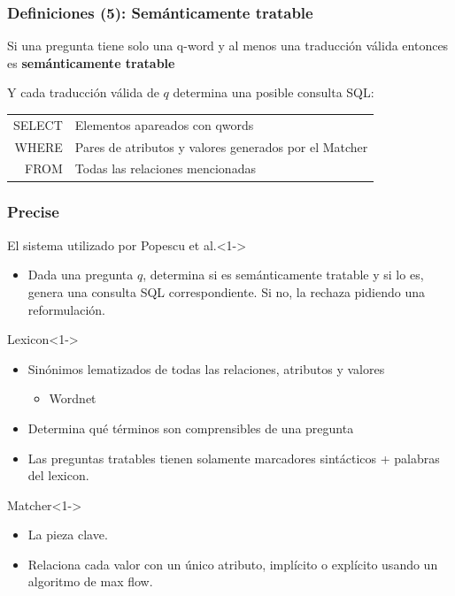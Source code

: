 \fontsize{10pt}{11.2}\selectfont
\begin{frame}[<+->]
\frametitle{Definiciones (5): Semánticamente tratable}
Si una pregunta tiene solo una q-word y al menos una traducción válida entonces es \textbf{semánticamente tratable}

\bigskip
\bigskip

Y cada traducción válida de $q$ determina una posible consulta SQL:
\bigskip
\centering
\begin{tabular}{ r | l }
SELECT &  Elementos apareados con qwords \\
WHERE & Pares de atributos y valores generados por el Matcher\\
FROM & Todas las relaciones mencionadas \\
\end{tabular}
\end{frame}


\fontsize{9.5pt}{7.2}\selectfont
\begin{frame}
\frametitle{Precise}

  \begin{block}{El sistema utilizado por Popescu et al.}<1->
      \begin{itemize}
          \item Dada una pregunta $q$, determina si es semánticamente tratable y si lo es, genera una consulta SQL correspondiente. Si no, la rechaza pidiendo una reformulación.
        \end{itemize}
    \end{block}
   \begin{block}{Lexicon}<1->
      \begin{itemize}
          \item Sinónimos lematizados de todas las relaciones, atributos y valores
          \begin{itemize}
            \item Wordnet
          \end{itemize}
          \item Determina qué términos son comprensibles de una pregunta
          \item Las preguntas tratables tienen solamente marcadores sintácticos + palabras del lexicon.
        \end{itemize}
    \end{block}
    \begin{block}{Matcher}<1->
      \begin{itemize}
          \item La pieza clave.
          \item Relaciona cada valor con un único atributo, implícito o explícito usando un algoritmo de max flow.
      \end{itemize}
    \end{block}
\end{frame}

